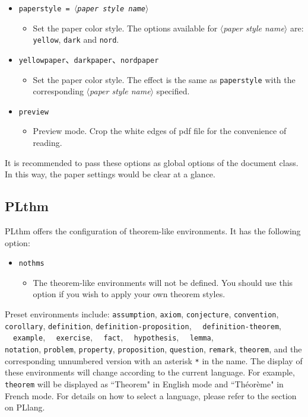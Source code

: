 \documentclass[allowbf]{lebhart}
\providecommand{\meta}[1]{$\langle${\normalfont\itshape#1}$\rangle$}
\providecommand{\PLlang}{\textsf{PLlang}}
\providecommand{\PLthm}{\textsf{PLthm}}
\begin{document}
\begin{itemize}
    \item \texttt{paperstyle = \meta{paper style name}}
        \begin{itemize}
            \item Set the paper color style. The options available for \meta{paper style name} are: \texttt{yellow}, \texttt{dark} and \texttt{nord}.
        \end{itemize}
    \item \texttt{yellowpaper}、\texttt{darkpaper}、\texttt{nordpaper}
        \begin{itemize}
            \item Set the paper color style. The effect is the same as \texttt{paperstyle} with the corresponding \meta{paper style name} specified.
        \end{itemize}
    \item \texttt{preview}
        \begin{itemize}
            \item Preview mode. Crop the white edges of pdf file for the convenience of reading.
        \end{itemize}
\end{itemize}

It is recommended to pass these options as global options of the document class. In this way, the paper settings would be clear at a glance.

\subsection{PLthm}

\PLthm{} offers the configuration of theorem-like environments. It has the following option:
\begin{itemize}
    \item \texttt{nothms}
    \begin{itemize}
        \item The theorem-like environments will not be defined. You should use this option if you wish to apply your own theorem styles.
    \end{itemize}
\end{itemize}

Preset environments include: \texttt{assumption}, \texttt{axiom}, \texttt{conjecture}, \texttt{convention}, \texttt{corollary}, \texttt{definition}, \texttt{definition-proposition}, ~~\texttt{definition-theorem}, ~~\texttt{example}, ~~\texttt{exercise}, ~~\texttt{fact}, ~~\texttt{hypothesis}, ~~\texttt{lemma}, \\\texttt{notation}, \texttt{problem}, \texttt{property}, \texttt{proposition}, \texttt{question}, \texttt{remark}, \texttt{theorem}, and the corresponding unnumbered version with an asterisk \lstinline|*| in the name. The display of these environments will change according to the current language. For example, \texttt{theorem} will be displayed as ``Theorem" in English mode and ``Théorème" in French mode. For details on how to select a language, please refer to the section on \PLlang{}.
\end{document}
